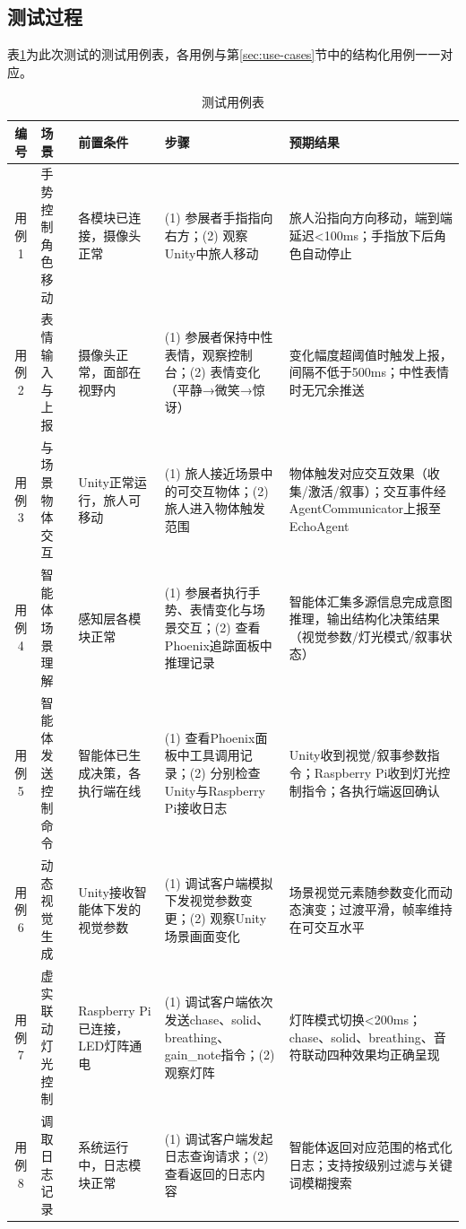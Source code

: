 \documentclass[bachelor]{njupthesis}
\begin{document}
\subsection{测试过程}

表\ref{tbl:test-cases}为此次测试的测试用例表，各用例与第\ref{sec:use-cases}节中的结构化用例一一对应。

\begin{table}[h]
\centering
\caption{测试用例表}
\renewcommand{\arraystretch}{0.95}
\begin{tabularx}{\linewidth}{clp{2.2cm}XX}
\toprule
编号 & 场景 & 前置条件 & 步骤 & 预期结果 \\
\midrule
用例1 & 手势控制角色移动 & 各模块已连接，摄像头正常 &
(1) 参展者手指指向右方；(2) 观察Unity中旅人移动 &
旅人沿指向方向移动，端到端延迟<100ms；手指放下后角色自动停止 \\
用例2 & 表情输入与上报 & 摄像头正常，面部在视野内 &
(1) 参展者保持中性表情，观察控制台；(2) 表情变化（平静→微笑→惊讶） &
变化幅度超阈值时触发上报，间隔不低于500ms；中性表情时无冗余推送 \\
用例3 & 与场景物体交互 & Unity正常运行，旅人可移动 &
(1) 旅人接近场景中的可交互物体；(2) 旅人进入物体触发范围 &
物体触发对应交互效果（收集/激活/叙事）；交互事件经AgentCommunicator上报至EchoAgent \\
用例4 & 智能体场景理解 & 感知层各模块正常 &
(1) 参展者执行手势、表情变化与场景交互；(2) 查看Phoenix追踪面板中推理记录 &
智能体汇集多源信息完成意图推理，输出结构化决策结果（视觉参数/灯光模式/叙事状态） \\
用例5 & 智能体发送控制命令 & 智能体已生成决策，各执行端在线 &
(1) 查看Phoenix面板中工具调用记录；(2) 分别检查Unity与Raspberry Pi接收日志 &
Unity收到视觉/叙事参数指令；Raspberry Pi收到灯光控制指令；各执行端返回确认 \\
用例6 & 动态视觉生成 & Unity接收智能体下发的视觉参数 &
(1) 调试客户端模拟下发视觉参数变更；(2) 观察Unity场景画面变化 &
场景视觉元素随参数变化而动态演变；过渡平滑，帧率维持在可交互水平 \\
用例7 & 虚实联动灯光控制 & Raspberry Pi已连接，LED灯阵通电 &
(1) 调试客户端依次发送chase、solid、breathing、gain\_note指令；(2) 观察灯阵 &
灯阵模式切换<200ms；chase、solid、breathing、音符联动四种效果均正确呈现 \\
用例8 & 调取日志记录 & 系统运行中，日志模块正常 &
(1) 调试客户端发起日志查询请求；(2) 查看返回的日志内容 &
智能体返回对应范围的格式化日志；支持按级别过滤与关键词模糊搜索 \\
\bottomrule
\end{tabularx}
\label{tbl:test-cases}
\end{table}
\end{document}

